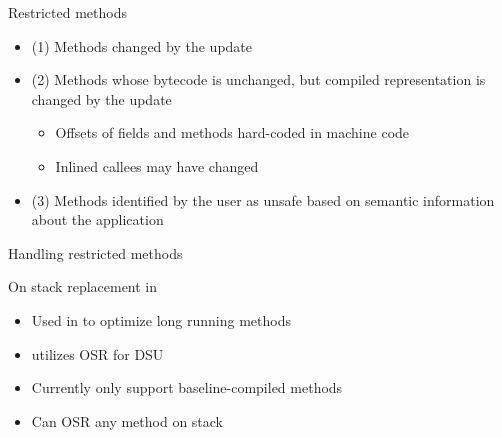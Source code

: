{
\begin{frame}[t,fragile]{Restricted methods}%
\begin{itemize}
\item (1) Methods changed by the update
\item (2) Methods whose bytecode is unchanged, but compiled representation is
      changed by the update
  \begin{itemize}
  \item Offsets of fields and methods hard-coded in machine code
  \item Inlined callees may have changed
  \end{itemize}
\item (3) Methods identified by the user as unsafe based on semantic
information about the application
\end{itemize}
\end{frame}
}

\begin{frame}[c,fragile]{Handling restricted methods}%
\hspace*{-5mm}
\end{frame}

\begin{frame}[t,fragile]{On stack replacement in \DSU{}}%
\begin{itemize}
\item Used in \JikesRVM{} to optimize long running methods
\item \DSU{} utilizes OSR for DSU
\item Currently only support baseline-compiled methods
\item Can OSR any method on stack
\end{itemize}
\end{frame}


